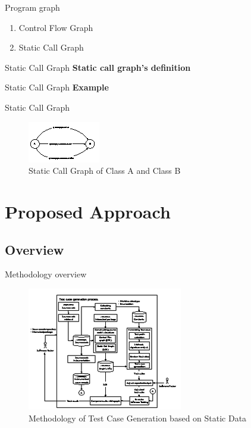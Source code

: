 \documentclass{beamer}
\begin{document}
\begin{frame}{Program graph}
    \begin{enumerate}
        \item<1-> Control Flow Graph
        \item<2-> Static Call Graph
    \end{enumerate}
\end{frame}

\begin{frame}{Static Call Graph}
    \textbf{Static call graph's definition}
\end{frame}

\begin{frame}{Static Call Graph}
    \textbf{Example}
\end{frame}

\begin{frame}{Static Call Graph}
    \begin{figure}
        \includegraphics[width=0.6\paperwidth]{figure/SCG-A-and-B}
        \caption{Static Call Graph of Class A and Class B}
        \label{fig:staticCallGraphAandB}
    \end{figure}
\end{frame}


%
\section{Proposed Approach}
\subsection{Overview}
\begin{frame}{Methodology overview}
    \begin{figure}
        \includegraphics[height=0.65\paperheight]{figure/Methodology.eps}
        \caption{Methodology of Test Case Generation based on Static Data}
        \label{fig:methodologyOverview}
    \end{figure}
\end{frame}
\end{document}
